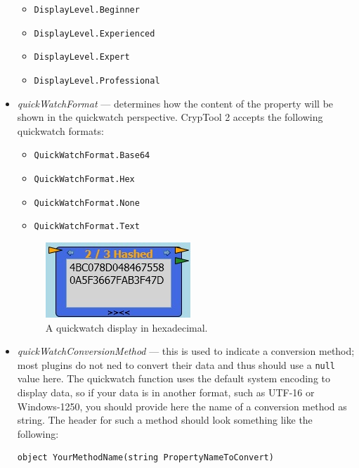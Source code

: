 \begin{itemize}
	\begin{itemize}
		\item \texttt{DisplayLevel.Beginner}
		\item \texttt{DisplayLevel.Experienced}
		\item \texttt{DisplayLevel.Expert}
		\item \texttt{DisplayLevel.Professional}
	\end{itemize}
\clearpage
	
	\item \textit{quickWatchFormat} --- determines how the content of the property will be shown in the quickwatch perspective. CrypTool 2 accepts the following quickwatch formats:
	
	\begin{itemize}
		\item \texttt{QuickWatchFormat.Base64}
		\item \texttt{QuickWatchFormat.Hex}
		\item \texttt{QuickWatchFormat.None}
		\item \texttt{QuickWatchFormat.Text}
	\end{itemize}

\begin{figure}[h]
	\centering
		\includegraphics{figures/quick_watch.jpg}
	\caption{A quickwatch display in hexadecimal.}
	\label{fig:quick_watch}
\end{figure}
	
	\item \textit{quickWatchConversionMethod} --- this is used to indicate a conversion method; most plugins do not ned to convert their data and thus should use a \texttt{null} value here. The quickwatch function uses the default system encoding to display data, so if your data is in another format, such as UTF-16 or Windows-1250, you should provide here the name of a conversion method as string. The header for such a method should look something like the following:

\begin{lstlisting}
object YourMethodName(string PropertyNameToConvert)
\end{lstlisting}

\end{itemize}

